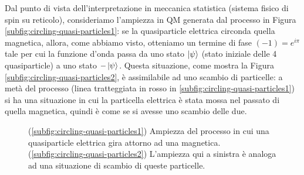 \noindent Dal punto di vista dell'interpretazione in meccanica statistica (sistema fisico di spin su reticolo), consideriamo l'ampiezza in QM generata dal processo in Figura \ref{subfig:circling-quasi-particles1}: se la quasiparticle elettrica circonda quella magnetica, allora, come abbiamo visto, otteniamo un termine di fase $(-1)=e^{i\pi}$ tale per cui la funzione d'onda passa da uno stato $\ket \psi$ (stato iniziale delle 4 quasiparticle) a uno stato $-\ket \psi$. Questa situazione, come mostra la Figura \ref{subfig:circling-quasi-particles2}, è assimilabile ad uno scambio di particelle: a metà del processo (linea tratteggiata in rosso in \ref{subfig:circling-quasi-particles1}) si ha una situazione in cui la particella elettrica è stata mossa nel passato di quella magnetica, quindi è come se si avesse uno scambio delle due. 

\begin{figure}[!ht]
	\centering	
	 \qquad \qquad
	\caption{(\ref{subfig:circling-quasi-particles1}) Ampiezza del processo in cui una quasiparticle elettrica gira attorno ad una magnetica. (\ref{subfig:circling-quasi-particles2}) L'ampiezza qui a sinistra è analoga ad una situazione di scambio di queste particelle.}
    \label{fig:circling-quasi-particles}
\end{figure}

